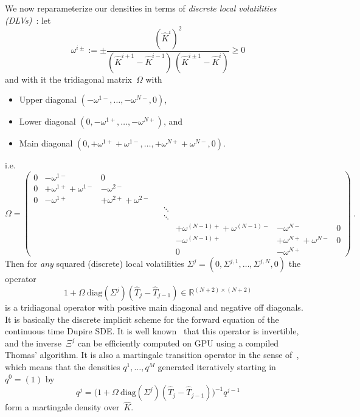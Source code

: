 \documentclass[11pt,a4paper]{article}
\newcommand{\R}{\mathbb{R}}
\DeclareRobustCommand{\eqx}{\begin{equation}}                                         %
\DeclareRobustCommand{\eqend}{\end{equation}}                                         %
\begin{document}
We now reparameterize our densities in terms of \emph{discrete local volatilities (DLVs)}~\citep{DLV}: let
$$
    \omega^{i\pm} := \pm    \frac{ (\hat K^{i})^2 }{ (\hat K^{i+1} - \hat K^{i-1})\,(\hat K^{i\pm 1} - \hat K^{i}) }  \geq 0
$$
and with it the tridiagonal matrix~$\Omega$ with
\begin{itemize}
    \item Upper diagonal $( -\omega^{1-}, \ldots, -\omega^{N-}, 0 )$,
    \item Lower diagonal $( 0, -\omega^{1+}, \ldots, -\omega^{N+} )$, and
    \item Main diagonal $( 0, +\omega^{1+}+\omega^{1-}, \ldots, +\omega^{N+}+\omega^{N-}, 0 )$.
\end{itemize}
i.e.
\eqx
    \Omega = \left(
                \begin{array}{cccccccccc}
                0 & -\omega^{1-} & 0 \\
                0 & +\omega^{1+}+\omega^{1-} & -\omega^{2-} \\
                0 & -\omega^{1+} & +\omega^{2+}+\omega^{2-} \\
                & & & &  \ddots\\
                & & & &  \ddots\\
                & & & & & +\omega^{(N-1)+}+\omega^{(N-1)-} & -\omega^{N-} & 0 \\
                & & & & & -\omega^{(N-1)+} & +\omega^{N+}+\omega^{N-} & 0 \\
                & & & & & 0 & -\omega^{N+} &
                \end{array}
    \right) \ .
\eqend
Then for \emph{any} squared (discrete) local volatilities $\Sigma^j = ( 0, \Sigma^{j,1}, \ldots, \Sigma^{j,N}, 0 )$
the operator
\eqx
            1 + \Omega\ \mathrm{diag}(\Sigma^j) (\hat T_j - \hat T_{j-1}) \in \R^{(N+2)\times(N+2)}
\eqend
is a tridiagonal operator with positive main diagonal and negative off diagonals.
It is basically the discrete implicit scheme for the forward equation of the continuous time Dupire SDE.
It is well known~\citep{DLV}
that this operator is invertible, and the inverse~$\Xi^j$ can be efficiently computed on GPU using a compiled
Thomas' algorithm. It is also
a martingale transition operator in
 the sense of~\citet{DLV}, which means that the densities $q^1,\ldots,q^M$ generated
 iteratively starting in $q^0=(1)$ by
\begin{equation}\label{eq:densitytrans}
    q^j = \Big( 1+  \Omega\ \mathrm{diag}(\Sigma^j) (\hat T_j - \hat T_{j-1}) \Big)^{-1} q^{j-1}
\end{equation}
form a martingale density over~$\hat K$.
\end{document}
